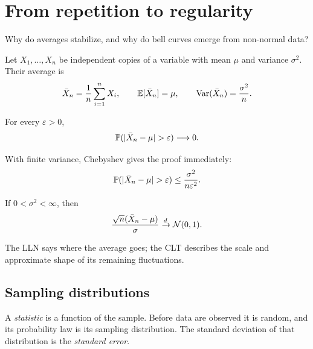 \chapter{From repetition to regularity}

\begin{question}
Why do averages stabilize, and why do bell curves emerge from non-normal data?
\end{question}

Let $X_1,\ldots,X_n$ be independent copies of a variable with mean $\mu$ and variance $\sigma^2$. Their average is
\[
\bar X_n=\frac1n\sum_{i=1}^nX_i,
\qquad
\mathbb E[\bar X_n]=\mu,
\qquad
\operatorname{Var}(\bar X_n)=\frac{\sigma^2}{n}.
\]

\begin{theorem}
For every $\varepsilon>0$,
\[
\P(|\bar X_n-\mu|>\varepsilon)\longrightarrow0.
\]
\end{theorem}

With finite variance, Chebyshev gives the proof immediately:
\[
\P(|\bar X_n-\mu|>\varepsilon)
\le \frac{\sigma^2}{n\varepsilon^2}.
\]

\begin{theorem}
If $0<\sigma^2<\infty$, then
\[
\frac{\sqrt n(\bar X_n-\mu)}{\sigma}
\xrightarrow{d}\mathcal N(0,1).
\]
\end{theorem}

The LLN says where the average goes; the CLT describes the scale and approximate shape of its remaining fluctuations.

\begin{center}
\end{center}

\section{Sampling distributions}

A \emph{statistic} is a function of the sample. Before data are observed it is random, and its probability law is its sampling distribution. The standard deviation of that distribution is the \emph{standard error}.

